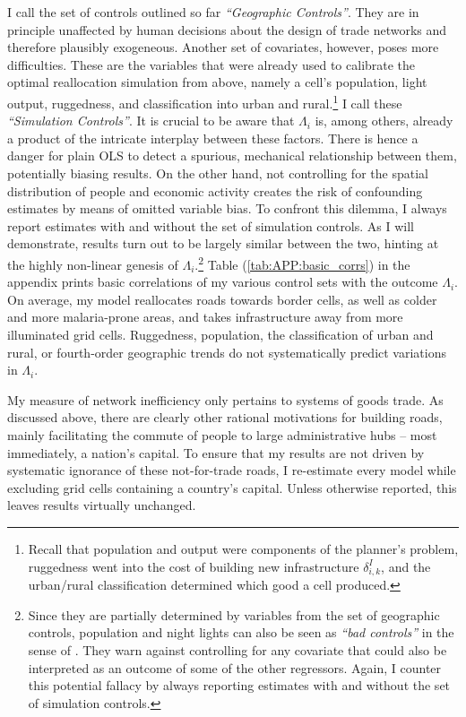 \documentclass[11pt, oneside]{article}   	%
\let\oldref\ref
\renewcommand{\ref}[1]{(\oldref{#1})}
\begin{document}
I call the set of controls outlined so far \emph{``Geographic Controls''}. They are in principle unaffected by human decisions about the design of trade networks and therefore plausibly exogeneous. Another set of covariates, however, poses more difficulties. These are the variables that were already used to calibrate the optimal reallocation simulation from above, namely a cell's population, light output, ruggedness, and classification into urban and rural.\footnote{Recall that population and output were components of the planner's problem, ruggedness went into the cost of building new infrastructure $\delta^{I}_{i,k}$, and the urban/rural classification determined which good a cell produced.} I call these \emph{``Simulation Controls''}. It is crucial to be aware that $\Lambda_{i}$ is, among others, already a product of the intricate interplay between these factors. There is hence a danger for plain OLS to detect a spurious, mechanical relationship between them, potentially biasing results. On the other hand, not controlling for the spatial distribution of people and economic activity creates the risk of confounding estimates by means of omitted variable bias. To confront this dilemma, I always report estimates with and without the set of simulation controls. As I will demonstrate, results turn out to be largely similar between the two, hinting at the highly non-linear genesis of $\Lambda_{i}$.\footnote{Since they are partially determined by variables from the set of geographic controls, population and night lights can also be seen as \emph{``bad controls''} in the sense of \cite{Angrist_MostlyHarmlessEconometrics_2008}. They warn against controlling for any covariate that could also be interpreted as an outcome of some of the other regressors. Again, I counter this potential fallacy by always reporting estimates with and without the set of simulation controls.} Table \ref{tab:APP:basic_corrs} in the appendix prints basic correlations of my various control sets with the outcome $\Lambda_{i}$. On average, my model reallocates roads towards border cells, as well as colder and more malaria-prone areas, and takes infrastructure away from more illuminated grid cells. Ruggedness, population, the classification of urban and rural, or fourth-order geographic trends do not systematically predict variations in $\Lambda_{i}$.

My measure of network inefficiency only pertains to systems of goods trade. As discussed above, there are clearly other rational motivations for building roads, mainly facilitating the commute of people to large administrative hubs -- most immediately, a nation's capital. To ensure that my results are not driven by systematic ignorance of these not-for-trade roads, I re-estimate every model while excluding grid cells containing a country's capital. Unless otherwise reported, this leaves results virtually unchanged.
\end{document}
